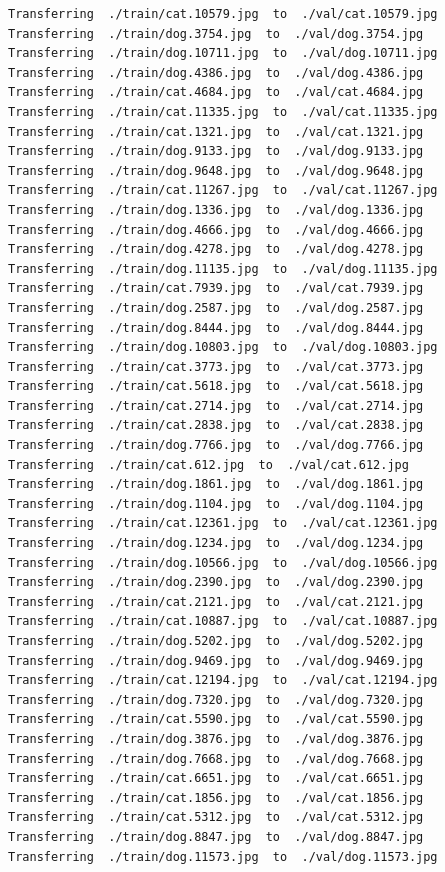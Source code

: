 \documentclass[]{book}
\theoremstyle{definition}
\theoremstyle{definition}
\theoremstyle{definition}
\theoremstyle{remark}
\begin{document}
\begin{verbatim}
Transferring  ./train/cat.10579.jpg  to  ./val/cat.10579.jpg
Transferring  ./train/dog.3754.jpg  to  ./val/dog.3754.jpg
Transferring  ./train/dog.10711.jpg  to  ./val/dog.10711.jpg
Transferring  ./train/dog.4386.jpg  to  ./val/dog.4386.jpg
Transferring  ./train/cat.4684.jpg  to  ./val/cat.4684.jpg
Transferring  ./train/cat.11335.jpg  to  ./val/cat.11335.jpg
Transferring  ./train/cat.1321.jpg  to  ./val/cat.1321.jpg
Transferring  ./train/dog.9133.jpg  to  ./val/dog.9133.jpg
Transferring  ./train/dog.9648.jpg  to  ./val/dog.9648.jpg
Transferring  ./train/cat.11267.jpg  to  ./val/cat.11267.jpg
Transferring  ./train/dog.1336.jpg  to  ./val/dog.1336.jpg
Transferring  ./train/dog.4666.jpg  to  ./val/dog.4666.jpg
Transferring  ./train/dog.4278.jpg  to  ./val/dog.4278.jpg
Transferring  ./train/dog.11135.jpg  to  ./val/dog.11135.jpg
Transferring  ./train/cat.7939.jpg  to  ./val/cat.7939.jpg
Transferring  ./train/dog.2587.jpg  to  ./val/dog.2587.jpg
Transferring  ./train/dog.8444.jpg  to  ./val/dog.8444.jpg
Transferring  ./train/dog.10803.jpg  to  ./val/dog.10803.jpg
Transferring  ./train/cat.3773.jpg  to  ./val/cat.3773.jpg
Transferring  ./train/cat.5618.jpg  to  ./val/cat.5618.jpg
Transferring  ./train/cat.2714.jpg  to  ./val/cat.2714.jpg
Transferring  ./train/cat.2838.jpg  to  ./val/cat.2838.jpg
Transferring  ./train/dog.7766.jpg  to  ./val/dog.7766.jpg
Transferring  ./train/cat.612.jpg  to  ./val/cat.612.jpg
Transferring  ./train/dog.1861.jpg  to  ./val/dog.1861.jpg
Transferring  ./train/dog.1104.jpg  to  ./val/dog.1104.jpg
Transferring  ./train/cat.12361.jpg  to  ./val/cat.12361.jpg
Transferring  ./train/dog.1234.jpg  to  ./val/dog.1234.jpg
Transferring  ./train/dog.10566.jpg  to  ./val/dog.10566.jpg
Transferring  ./train/dog.2390.jpg  to  ./val/dog.2390.jpg
Transferring  ./train/cat.2121.jpg  to  ./val/cat.2121.jpg
Transferring  ./train/cat.10887.jpg  to  ./val/cat.10887.jpg
Transferring  ./train/dog.5202.jpg  to  ./val/dog.5202.jpg
Transferring  ./train/dog.9469.jpg  to  ./val/dog.9469.jpg
Transferring  ./train/cat.12194.jpg  to  ./val/cat.12194.jpg
Transferring  ./train/dog.7320.jpg  to  ./val/dog.7320.jpg
Transferring  ./train/cat.5590.jpg  to  ./val/cat.5590.jpg
Transferring  ./train/dog.3876.jpg  to  ./val/dog.3876.jpg
Transferring  ./train/dog.7668.jpg  to  ./val/dog.7668.jpg
Transferring  ./train/cat.6651.jpg  to  ./val/cat.6651.jpg
Transferring  ./train/cat.1856.jpg  to  ./val/cat.1856.jpg
Transferring  ./train/cat.5312.jpg  to  ./val/cat.5312.jpg
Transferring  ./train/dog.8847.jpg  to  ./val/dog.8847.jpg
Transferring  ./train/dog.11573.jpg  to  ./val/dog.11573.jpg

\end{verbatim}
\end{document}
